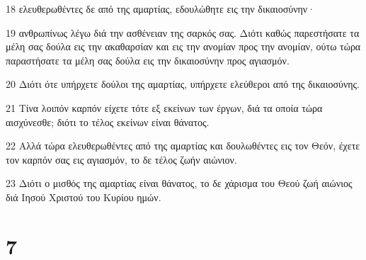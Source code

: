 \par 18 ελευθερωθέντες δε από της αμαρτίας, εδουλώθητε εις την δικαιοσύνην·
\par 19 ανθρωπίνως λέγω διά την ασθένειαν της σαρκός σας. Διότι καθώς παρεστήσατε τα μέλη σας δούλα εις την ακαθαρσίαν και εις την ανομίαν προς την ανομίαν, ούτω τώρα παραστήσατε τα μέλη σας δούλα εις την δικαιοσύνην προς αγιασμόν.
\par 20 Διότι ότε υπήρχετε δούλοι της αμαρτίας, υπήρχετε ελεύθεροι από της δικαιοσύνης.
\par 21 Τίνα λοιπόν καρπόν είχετε τότε εξ εκείνων των έργων, διά τα οποία τώρα αισχύνεσθε; διότι το τέλος εκείνων είναι θάνατος.
\par 22 Αλλά τώρα ελευθερωθέντες από της αμαρτίας και δουλωθέντες εις τον Θεόν, έχετε τον καρπόν σας εις αγιασμόν, το δε τέλος ζωήν αιώνιον.
\par 23 Διότι ο μισθός της αμαρτίας είναι θάνατος, το δε χάρισμα του Θεού ζωή αιώνιος διά Ιησού Χριστού του Κυρίου ημών.

\chapter{7}

